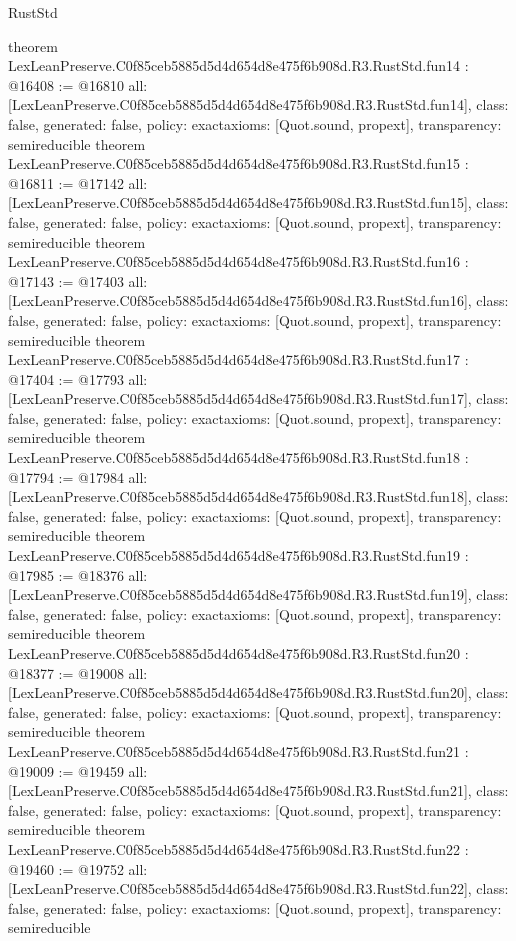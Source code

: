 \begin{lexlean}{RustStd}
\begin{coremodule}
{}
theorem LexLeanPreserve.C0f85ceb5885d5d4d654d8e475f6b908d.R3.RustStd.fun14 : @16408 := @16810 {
  all: [LexLeanPreserve.C0f85ceb5885d5d4d654d8e475f6b908d.R3.RustStd.fun14],
  class: false,
  generated: false,
  policy: exact{axioms: [Quot.sound, propext]},
  transparency: semireducible
}
theorem LexLeanPreserve.C0f85ceb5885d5d4d654d8e475f6b908d.R3.RustStd.fun15 : @16811 := @17142 {
  all: [LexLeanPreserve.C0f85ceb5885d5d4d654d8e475f6b908d.R3.RustStd.fun15],
  class: false,
  generated: false,
  policy: exact{axioms: [Quot.sound, propext]},
  transparency: semireducible
}
theorem LexLeanPreserve.C0f85ceb5885d5d4d654d8e475f6b908d.R3.RustStd.fun16 : @17143 := @17403 {
  all: [LexLeanPreserve.C0f85ceb5885d5d4d654d8e475f6b908d.R3.RustStd.fun16],
  class: false,
  generated: false,
  policy: exact{axioms: [Quot.sound, propext]},
  transparency: semireducible
}
theorem LexLeanPreserve.C0f85ceb5885d5d4d654d8e475f6b908d.R3.RustStd.fun17 : @17404 := @17793 {
  all: [LexLeanPreserve.C0f85ceb5885d5d4d654d8e475f6b908d.R3.RustStd.fun17],
  class: false,
  generated: false,
  policy: exact{axioms: [Quot.sound, propext]},
  transparency: semireducible
}
theorem LexLeanPreserve.C0f85ceb5885d5d4d654d8e475f6b908d.R3.RustStd.fun18 : @17794 := @17984 {
  all: [LexLeanPreserve.C0f85ceb5885d5d4d654d8e475f6b908d.R3.RustStd.fun18],
  class: false,
  generated: false,
  policy: exact{axioms: [Quot.sound, propext]},
  transparency: semireducible
}
theorem LexLeanPreserve.C0f85ceb5885d5d4d654d8e475f6b908d.R3.RustStd.fun19 : @17985 := @18376 {
  all: [LexLeanPreserve.C0f85ceb5885d5d4d654d8e475f6b908d.R3.RustStd.fun19],
  class: false,
  generated: false,
  policy: exact{axioms: [Quot.sound, propext]},
  transparency: semireducible
}
theorem LexLeanPreserve.C0f85ceb5885d5d4d654d8e475f6b908d.R3.RustStd.fun20 : @18377 := @19008 {
  all: [LexLeanPreserve.C0f85ceb5885d5d4d654d8e475f6b908d.R3.RustStd.fun20],
  class: false,
  generated: false,
  policy: exact{axioms: [Quot.sound, propext]},
  transparency: semireducible
}
theorem LexLeanPreserve.C0f85ceb5885d5d4d654d8e475f6b908d.R3.RustStd.fun21 : @19009 := @19459 {
  all: [LexLeanPreserve.C0f85ceb5885d5d4d654d8e475f6b908d.R3.RustStd.fun21],
  class: false,
  generated: false,
  policy: exact{axioms: [Quot.sound, propext]},
  transparency: semireducible
}
theorem LexLeanPreserve.C0f85ceb5885d5d4d654d8e475f6b908d.R3.RustStd.fun22 : @19460 := @19752 {
  all: [LexLeanPreserve.C0f85ceb5885d5d4d654d8e475f6b908d.R3.RustStd.fun22],
  class: false,
  generated: false,
  policy: exact{axioms: [Quot.sound, propext]},
  transparency: semireducible
}
\end{coremodule}
\end{lexlean}
